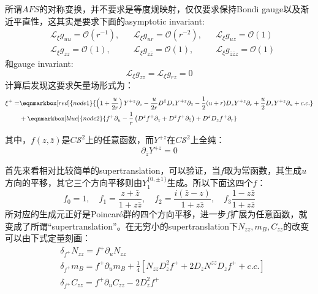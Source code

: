 所谓$AFS$的对称变换，并不要求是等度规映射，仅仅要求保持Bondi gauge以及渐近平直性，这其实是要求下面的asymptotic invariant:
\begin{align*}
	&\mathcal{L}_\xi g_{uu}=\mathcal{O}(r^{-1}),&&\mathcal{L}_\xi g_{ur}=\mathcal{O}(r^{-2}),&&\mathcal{L}_\xi g_{uz}=\mathcal{O}(1)\\
	&\mathcal{L}_\xi g_{zz}=\mathcal{O}(1),&&\mathcal{L}_\xi g_{z\bar z}=\mathcal{O}(1),&&\mathcal{L}_\xi g_{\bar z \bar zz}=\mathcal{O}(1)
\end{align*}
和gauge invariant:
\begin{equation}
	\mathcal{L}_\xi g_{zz}=\mathcal{L}_\xi g_{rz}=0
\end{equation}
计算后发现这要求矢量场形式为：
\begin{equation}
	\begin{aligned}
		\xi^+=&\eqnmarkbox[red]{node1}{\left(1+\frac{u}{2r}\right)Y^{+z}\partial_z-\frac{u}{2r}D^{\bar z}D_zY^{+z}\partial_{\bar z}-\frac{1}{2}(u+r)D_zY^{+z}\partial_r+\frac{u}{2}D_zY^{+z}\partial_u+c.c.}\\
		&+\eqnmarkbox[blue]{node2}{f^+\partial_u-\frac{1}{r}\left(D^zf^+\partial_z+D^{\bar z}f^+\partial_{\bar z}\right)+D^zD_zf^+\partial_r}
	\end{aligned}
\end{equation}

\noindent 其中，$f(z,\bar z)$是$C\mathcal{S}^2$上的任意函数，而$Y^{+z}$在$C\mathcal{S}^2$上全纯：
\begin{equation}\label{Y}
	\partial_{\bar z}Y^{+z}=0
\end{equation}

首先来看相对比较简单的supertranslation，可以验证，当$f$取为常函数，其生成$u$方向的平移，其它三个方向平移则由$Y_1^{\{0,\pm1\}}$生成。所以下面这四个$f$：
\begin{equation}\label{f}
	f_0=1,\quad f_1=\frac{z+\bar z}{1+z\bar z},\quad f_2=\frac{i\left(\bar z-z\right)}{1+z\bar z},\quad f_3\frac{1-z\bar z}{1+z\bar z}
\end{equation}
所对应的生成元正好是Poincar\'e群的四个方向平移，进一步$f$扩展为任意函数，就变成了所谓“supertranslation”。在无穷小的supertranslation下$N_{zz},m_B,C_{zz}$的改变可以由下式定量刻画：
\begin{equation}
	\begin{aligned}
		&\delta_{f^+}N_{zz}=f^+\partial_u N_{zz}\\
		&\delta_{f^+} m_B=f^+\partial_u m_B+\frac{1}{4}\left[N_{zz}D_z^2f^++2D_zN^{zz}D_zf^++c.c.\right]\\
		&\delta_{f^+} C_{zz}=f^+\partial_u C_{zz}-2D_z^2f^+
	\end{aligned}
\end{equation}

